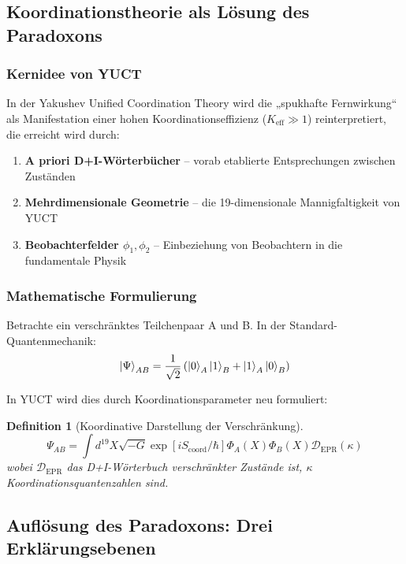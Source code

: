 \documentclass[11pt,a4paper]{article}
\newtheorem{definition}{Definition}
\begin{document}
	\subsection{Koordinationstheorie als Lösung des Paradoxons}
	\label{subsec:yuct-solution}
	
	\subsubsection{Kernidee von YUCT}
	In der Yakushev Unified Coordination Theory wird die „spukhafte Fernwirkung“ als Manifestation einer hohen Koordinationseffizienz ($K_{\mathrm{eff}} \gg 1$) reinterpretiert, die erreicht wird durch:
	
	\begin{enumerate}
		\item \textbf{A priori D+I-Wörterbücher} -- vorab etablierte Entsprechungen zwischen Zuständen
		\item \textbf{Mehrdimensionale Geometrie} -- die 19-dimensionale Mannigfaltigkeit von YUCT
		\item \textbf{Beobachterfelder $\phi_1, \phi_2$} -- Einbeziehung von Beobachtern in die fundamentale Physik
	\end{enumerate}
	
	\subsubsection{Mathematische Formulierung}
	Betrachte ein verschränktes Teilchenpaar A und B. In der Standard-Quantenmechanik:
	\begin{equation}
		\ket{\Psi}_{AB} = \frac{1}{\sqrt{2}} \left( \ket{0}_A \ket{1}_B + \ket{1}_A \ket{0}_B \right)
	\end{equation}
	
	In YUCT wird dies durch Koordinationsparameter neu formuliert:
	
	\begin{definition}[Koordinative Darstellung der Verschränkung]
		\begin{equation}
			\Psi_{AB} = \int d^{19}X \sqrt{-G} \exp\left[i S_{\text{coord}}/\hbar\right] \Phi_A(X) \Phi_B(X) \mathcal{D}_{\text{EPR}}(\kappa)
		\end{equation}
		wobei $\mathcal{D}_{\text{EPR}}$ das D+I-Wörterbuch verschränkter Zustände ist, $\kappa$ Koordinationsquantenzahlen sind.
	\end{definition}
	
	\subsection{Auflösung des Paradoxons: Drei Erklärungsebenen}
	\label{subsec:three-levels}
	
\end{document}
